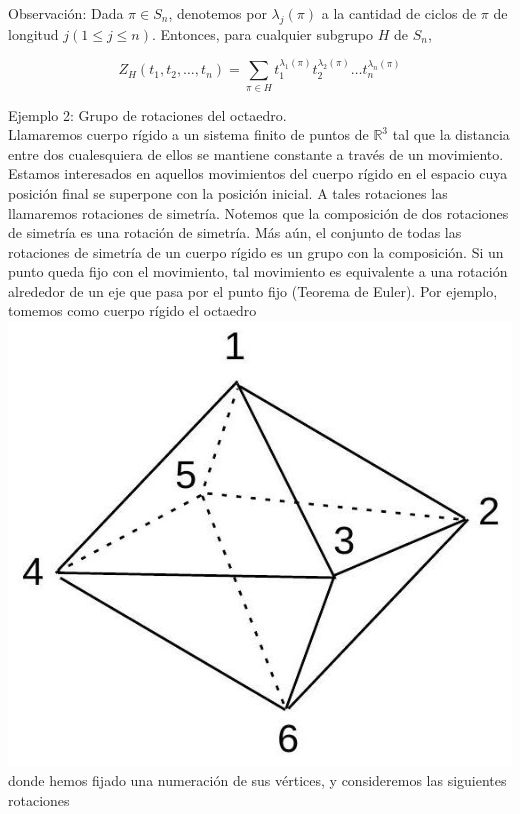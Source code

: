 \documentclass[10pt]{article}
\begin{document}
Observación: Dada $\pi \in S_{n}$, denotemos por $\lambda_{j}(\pi)$ a la cantidad de ciclos de $\pi$ de longitud $j(1 \leq j \leq n)$. Entonces, para cualquier subgrupo $H$ de $S_{n}$,

$$
Z_{H}\left(t_{1}, t_{2}, \ldots, t_{n}\right)=\sum_{\pi \in H} t_{1}^{\lambda_{1}(\pi)} t_{2}^{\lambda_{2}(\pi)} \ldots t_{n}^{\lambda_{n}(\pi)}
$$

Ejemplo 2: Grupo de rotaciones del octaedro.\\
Llamaremos cuerpo rígido a un sistema finito de puntos de $\mathbb{R}^{3}$ tal que la distancia entre dos cualesquiera de ellos se mantiene constante a través de un movimiento. Estamos interesados en aquellos movimientos del cuerpo rígido en el espacio cuya posición final se superpone con la posición inicial. A tales rotaciones las llamaremos rotaciones de simetría. Notemos que la composición de dos rotaciones de simetría es una rotación de simetría. Más aún, el conjunto de todas las rotaciones de simetría de un cuerpo rígido es un grupo con la composición. Si un punto queda fijo con el movimiento, tal movimiento es equivalente a una rotación alrededor de un eje que pasa por el punto fijo (Teorema de Euler). Por ejemplo, tomemos como cuerpo rígido el octaedro\\
\includegraphics[max width=\textwidth, center]{2025_09_05_3ba26226ec0baddb5a03g-43}\\
donde hemos fijado una numeración de sus vértices, y consideremos las siguientes rotaciones\\
\end{document}
